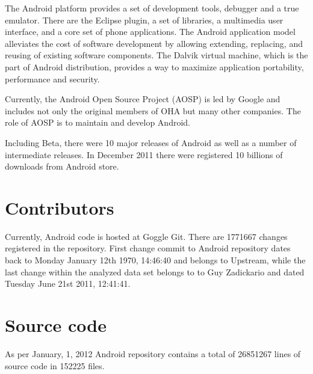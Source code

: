 \documentclass[a4paper]{article}
\numberwithin{equation}{subsection}
\begin{document}
The Android platform provides a set of development tools, debugger and a true emulator.
There are the Eclipse plugin, a set of libraries, a multimedia user interface, and a core set of 
phone applications. The Android application model alleviates the cost of software development 
by allowing extending, replacing, and reusing of existing software components. The Dalvik virtual 
machine, which is the part of Android distribution, provides a way to maximize application 
portability, performance and security.

Currently, the Android Open Source Project (AOSP) is led by Google and includes not only the 
original members of OHA but many other companies. The role of AOSP is to maintain and develop 
Android.

Including Beta, there were 10 major releases of Android as well as a number of intermediate 
releases. In December 2011 there were registered 10 billions of downloads from Android store. 

\section{Contributors}
Currently, Android code is hosted at Goggle Git. There are 1771667 changes 
registered in the repository. First change commit to Android repository dates back 
to Monday January 12th 1970, 14:46:40 and belongs to Upstream, while the last change
within the analyzed data set belongs to to Guy Zadickario and dated 
Tuesday June 21st 2011, 12:41:41.


\section{Source code}
As per January, 1, 2012 Android repository contains a total of 26851267 lines of source code in 
152225 files. 
\end{document}
